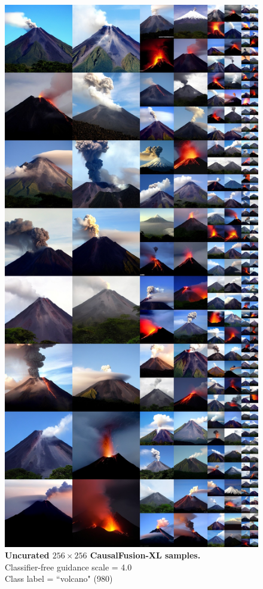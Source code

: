 \begin{figure}\centering
\includegraphics[width=\linewidth]{figs/xl256_980_cfg4.0.jpg}
\caption{\textbf{Uncurated $256\times256$ CausalFusion-XL samples.} \\Classifier-free guidance scale = 4.0\\Class label = ``volcano" (980)}\vspace{-2mm}
\label{fig:samples256_2}
\end{figure}


